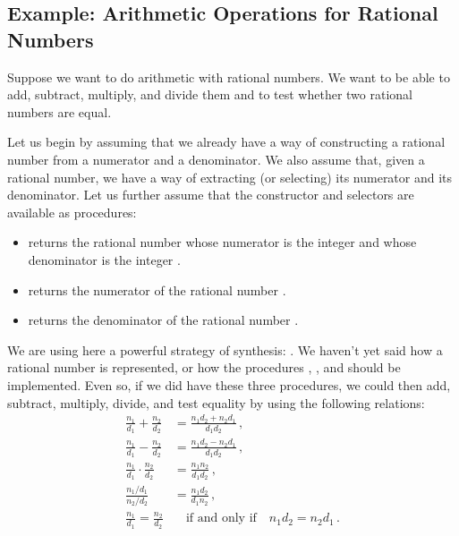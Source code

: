 \subsection{Example: Arithmetic Operations for Rational Numbers}
\label{Section 2.1.1}

Suppose we want to do arithmetic with rational numbers.
We want to be able to add, subtract, multiply, and divide them and to test whether two rational numbers are equal.

Let us begin by assuming that we already have a way of constructing a rational number from a numerator and a denominator.
We also assume that, given a rational number, we have a way of extracting (or selecting) its numerator and its denominator.
Let us further assume that the constructor and selectors are available as procedures:
\begin{itemize}

	\item
		 returns the rational number whose numerator is the integer  and whose denominator is the integer .

	\item
		 returns the numerator of the rational number .

	\item
		 returns the denominator of the rational number .

\end{itemize}

We are using here a powerful strategy of synthesis:
.
We haven’t yet said how a rational number is represented, or how the procedures , , and  should be implemented.
Even so, if we did have these three procedures, we could then add, subtract, multiply, divide, and test equality by using the following relations:
\begin{align*}
	\frac{n_1}{d_1} + \frac{n_2}{d_2} &= \frac{n_1 d_2 + n_2 d_1}{d_1 d_2} \,, \\[0.5em]
	\frac{n_1}{d_1} - \frac{n_2}{d_2} &= \frac{n_1 d_2 - n_2 d_1}{d_1 d_2} \,, \\[0.5em]
	\frac{n_1}{d_1} ⋅ \frac{n_2}{d_2} &= \frac{n_1 n_2}{d_1 d_2} \,, \\[0.5em]
	\frac{n_1 / d_1}{n_2 / d_2} &= \frac{n_1 d_2}{d_1 n_2} \,, \\[0.5em]
	\frac{n_1}{d_1} = \frac{n_2}{d_2} &\quad\text{if and only if} \quad n_1 d_2 = n_2 d_1 \,.
\end{align*}

